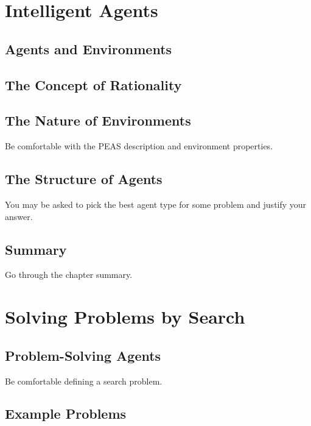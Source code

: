 \documentclass[exam={Midterm},color=true]{cs581exam}
\begin{document}
\section{Intelligent Agents}\label{sec:intelligent-agents}
\subsection{Agents and Environments}\label{subsec:2.1}
\subsection{The Concept of Rationality}\label{subsec:2.2}
\subsection{The Nature of Environments}\label{subsec:2.3}
Be comfortable with the PEAS description and environment properties.
\subsection{The Structure of Agents}\label{subsec:2.4}
You may be asked to pick the best agent type for some problem and justify
your answer.
\subsection{Summary}\label{subsec:2-summary}
Go through the chapter summary.

\section{Solving Problems by Search}\label{sec:solving-problems-by-search}
\subsection{Problem-Solving Agents}\label{subsec:3.1}
Be comfortable defining a search problem.
\subsection{Example Problems}\label{subsec:3.2}
\end{document}
